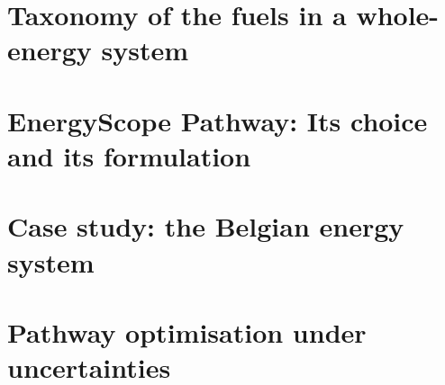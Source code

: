 \documentclass[a4paper,twoside,10pt,final]{memoir} %
\begin{document}

{\footnotesize}






\begin{appendices}

\chapter{Taxonomy of the fuels in a whole-energy system}
\label{app:Taxonomy}


\chapter{EnergyScope Pathway: Its choice and its formulation}
\label{app:EnergyScope}


\chapter{Case study: the Belgian energy system}
\label{app:case_study}


\chapter{Pathway optimisation under uncertainties}
\label{app:results_UQ}




\end{appendices}
\end{document}

